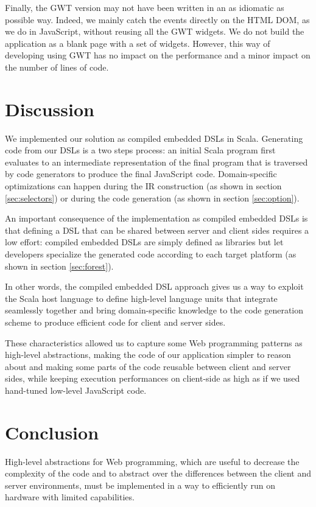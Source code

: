 \documentclass[preprint]{sigplanconf}
\begin{document}
Finally, the GWT version may not have been written in an as idiomatic as possible way. 
Indeed, we mainly catch the events directly on the HTML DOM, as we do in JavaScript, without
reusing all the GWT widgets. We do not build the application as a blank page with a set of
widgets. However, this way of developing using GWT has no impact on the performance and a minor
impact on the number of lines of code.

\section{Discussion}
\label{sec:discussion}

We implemented our solution as compiled embedded DSLs in Scala. Generating code from our DSLs is a
two steps process: an initial Scala program first evaluates to an intermediate representation of
the final program that is traversed by code generators to produce the final JavaScript code.
Domain-specific optimizations can happen during the IR construction (as shown in section
\ref{sec:selectors}) or during the code generation (as shown in section \ref{sec:option}).

An important consequence of the implementation as compiled embedded DSLs is that defining a DSL
that can be shared between server and client sides requires a low effort: compiled embedded DSLs are
simply defined as libraries but let developers specialize the generated code according to each
target platform (as shown in section \ref{sec:forest}).

In other words, the compiled embedded DSL approach gives us a way to exploit the Scala host language
to define high-level language units that integrate seamlessly together and bring domain-specific
knowledge to the code generation scheme to produce efficient code for client and server sides.

These characteristics allowed us to capture some Web programming patterns as high-level
abstractions, making the code of our application simpler to reason about and making some parts of
the code reusable between client and server sides, while keeping execution performances on
client-side as high as if we used hand-tuned low-level JavaScript code.

\section{Conclusion}
\label{sec:conclusion}

High-level abstractions for Web programming, which are useful to decrease the complexity of the code
and to abstract over the differences between the client and server environments, must be implemented
in a way to efficiently run on hardware with limited capabilities.
\end{document}
